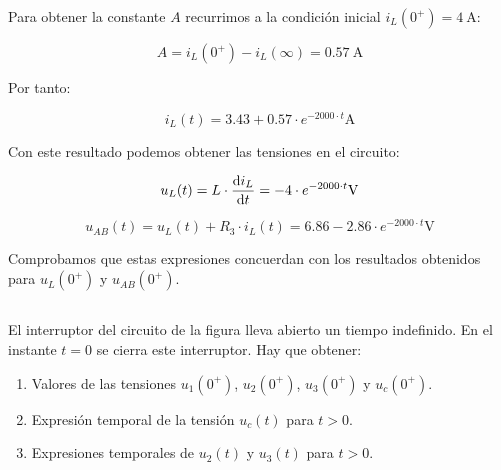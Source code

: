 \documentclass[12pt]{article}
\begin{document}
Para obtener la constante $A$ recurrimos a la condición inicial $i_L(0^+) = \qty{4}{\ampere}$:

\begin{equation*}
  A = i_L(0^+) - i_L(\infty) = \qty{0.57}{\ampere}
\end{equation*}

Por tanto:

\begin{equation*}
  i_L(t) = 3.43 + 0.57 \cdot e^{-2000 \cdot t} \unit{\ampere}
\end{equation*}

Con este resultado podemos obtener las tensiones en el circuito:

\begin{equation*}
  u_L(t) = L \cdot \diff{i_L}{t} = - 4 \cdot e^{-2000 \cdot t} \unit{\volt}
\end{equation*}


\begin{equation*}
  u_{AB}(t) =  u_L(t) + R_3 \cdot i_L(t) = 6.86 - 2.86 \cdot e^{-2000 \cdot t} \unit{\volt}
\end{equation*}

Comprobamos que estas expresiones concuerdan con los resultados obtenidos para $u_L(0^+)$ y $u_{AB}(0^+)$.

\clearpage

\subsection{}

El interruptor del circuito de la figura lleva abierto un tiempo indefinido. En el instante $t= 0$ se cierra este interruptor. Hay que obtener:
\begin{enumerate}
\item Valores de las tensiones $u_1(0^+)$, $u_2(0^+)$, $u_3(0^+)$ y $u_c(0^+)$.
\item Expresión temporal de la tensión $u_c(t)$ para $t > 0$.
\item Expresiones temporales de $u_2(t)$ y $u_3(t)$ para $t > 0$.
\end{enumerate}
\end{document}
